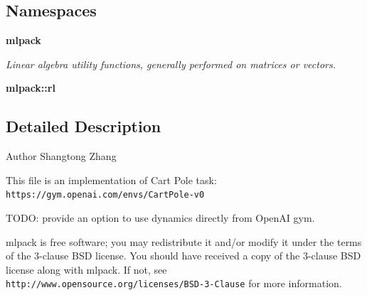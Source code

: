 \subsection*{Namespaces}
\begin{DoxyCompactItemize}
\item 
 \textbf{ mlpack}
\begin{DoxyCompactList}\small\item\em Linear algebra utility functions, generally performed on matrices or vectors. \end{DoxyCompactList}\item 
 \textbf{ mlpack\+::rl}
\end{DoxyCompactItemize}


\subsection{Detailed Description}
\begin{DoxyAuthor}{Author}
Shangtong Zhang
\end{DoxyAuthor}
This file is an implementation of Cart Pole task\+: {\tt https\+://gym.\+openai.\+com/envs/\+Cart\+Pole-\/v0}

T\+O\+DO\+: provide an option to use dynamics directly from Open\+AI gym.

mlpack is free software; you may redistribute it and/or modify it under the terms of the 3-\/clause B\+SD license. You should have received a copy of the 3-\/clause B\+SD license along with mlpack. If not, see {\tt http\+://www.\+opensource.\+org/licenses/\+B\+S\+D-\/3-\/\+Clause} for more information. 